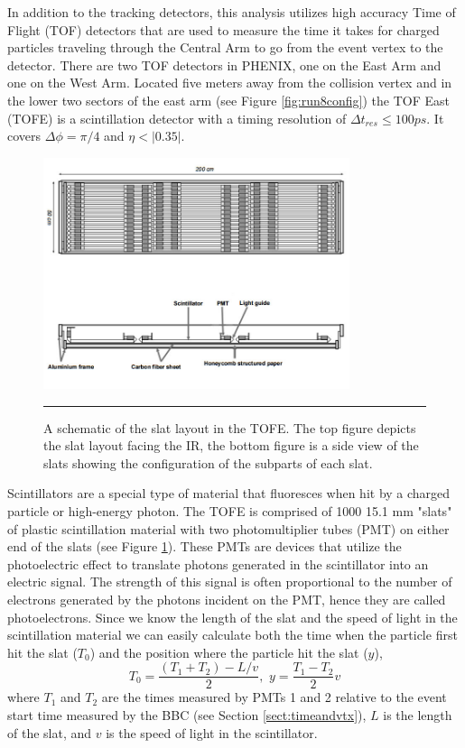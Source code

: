 In addition to the tracking detectors, this analysis utilizes high accuracy Time of Flight (TOF) detectors that are used to measure the time it takes for charged particles traveling through the Central Arm to go from the event vertex to the detector. \citep{TOFfocus} There are two TOF detectors in PHENIX, one on the East Arm and one on the West Arm. Located five meters away from the collision vertex and in the lower two sectors of the east arm (see Figure \ref{fig:run8config}) the TOF East (TOFE) is a scintillation detector with a timing resolution of $\Delta t_{res} \leq 100 ps$. It covers $\Delta\phi = \pi / 4$ and $\eta < |0.35|$. 

\begin{figure}[htbp]
  \centering
    \includegraphics[width=0.8\textwidth]{Figures/TOFEschematic.jpg}
    \rule{35em}{0.5pt}
  \caption[A schematic of the slat layout in the TOFE.]{A schematic of the slat layout in the TOFE. The top figure depicts the slat layout facing the IR, the bottom figure is a side view of the slats showing the configuration of the subparts of each slat.}
  \label{fig:TOFEschematic}
\end{figure}

Scintillators are a special type of material that fluoresces when hit by a charged particle or high-energy photon. The TOFE is comprised of 1000 15.1 mm "slats" of plastic scintillation material with two photomultiplier tubes (PMT) on either end of the slats (see Figure \ref{fig:TOFEschematic}). These PMTs are devices that utilize the photoelectric effect to translate photons generated in the scintillator into an electric signal. The strength of this signal is often proportional to the number of electrons generated by the photons incident on the PMT, hence they are called photoelectrons. Since we know the length of the slat and the speed of light in the scintillation material we can easily calculate both the time when the particle first hit the slat ($T_{0}$) and the position where the particle hit the slat ($y$),
\begin{equation}
T_{0} = \frac{(T_{1}+T_{2})-L/v}{2} , \, \, y = \frac{T_{1}-T_{2}}{2} v
\end{equation}
where $T_1$ and $T_{2}$ are the times measured by PMTs 1 and 2 relative to the event start time measured by the BBC (see Section \ref{sect:timeandvtx}), $L$ is the length of the slat, and $v$ is the speed of light in the scintillator.

